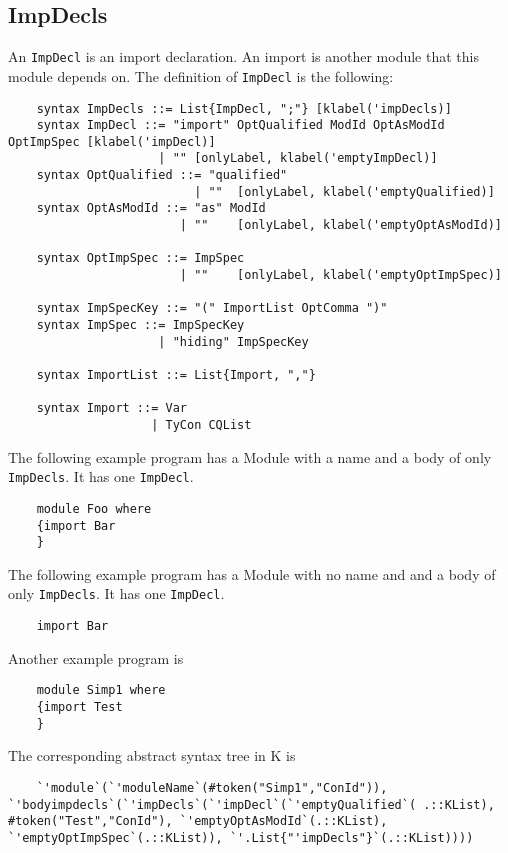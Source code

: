 \subsection{ImpDecls}
An \texttt{ImpDecl} is an import declaration. An import is another module that this module depends on.
The definition of \texttt{ImpDecl} is the following:
\begin{lstlisting}
    syntax ImpDecls ::= List{ImpDecl, ";"} [klabel('impDecls)]
    syntax ImpDecl ::= "import" OptQualified ModId OptAsModId OptImpSpec [klabel('impDecl)]
                     | "" [onlyLabel, klabel('emptyImpDecl)]
    syntax OptQualified ::= "qualified"
                          | ""  [onlyLabel, klabel('emptyQualified)]
    syntax OptAsModId ::= "as" ModId
                        | ""    [onlyLabel, klabel('emptyOptAsModId)]

    syntax OptImpSpec ::= ImpSpec
                        | ""    [onlyLabel, klabel('emptyOptImpSpec)]

    syntax ImpSpecKey ::= "(" ImportList OptComma ")"
    syntax ImpSpec ::= ImpSpecKey
                     | "hiding" ImpSpecKey

    syntax ImportList ::= List{Import, ","}

    syntax Import ::= Var
                    | TyCon CQList
\end{lstlisting}

\noindent
The following example program has a Module with a name and a body of only \texttt{ImpDecls}. It has one \texttt{ImpDecl}.

\begin{lstlisting}
	module Foo where
	{import Bar
	}
\end{lstlisting}

\noindent
The following example program has a Module with no name and and a body of only \texttt{ImpDecls}. It has one \texttt{ImpDecl}.

\begin{lstlisting}
	import Bar
\end{lstlisting}

\noindent
Another example program is
\begin{lstlisting}
	module Simp1 where
	{import Test
	}
\end{lstlisting}

\noindent
The corresponding abstract syntax tree in K is
\begin{lstlisting}
	`'module`(`'moduleName`(#token("Simp1","ConId")), `'bodyimpdecls`(`'impDecls`(`'impDecl`(`'emptyQualified`( .::KList), #token("Test","ConId"), `'emptyOptAsModId`(.::KList), `'emptyOptImpSpec`(.::KList)), `'.List{"'impDecls"}`(.::KList))))
\end{lstlisting}

